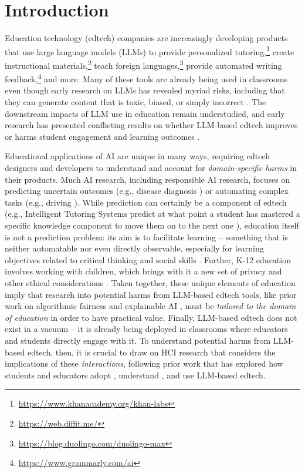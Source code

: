 \section{Introduction}
Education technology (edtech) companies are increasingly developing products that use large language models (LLMs) to provide personalized tutoring,\footnote{\url{https://www.khanacademy.org/khan-labs}} create instructional materials,\footnote{\url{https://web.diffit.me/}} teach foreign languages,\footnote{\url{https://blog.duolingo.com/duolingo-max}} provide automated writing feedback,\footnote{\url{https://www.grammarly.com/ai}} and more. Many of these tools are already being used in classrooms even though early research on LLMs has revealed myriad risks, including that they can generate content that is toxic, biased, or simply incorrect \cite{bender_dangers_2021, weidinger_taxonomy_2022, lee2024life}. The downstream impacts of LLM use in education remain understudied, and early research has presented conflicting results on whether LLM-based edtech improves or harms student engagement and learning outcomes \cite{nie_gpt_2024, bastani_generative_2024, lo_engagement_2024, pardos_chatgpt_2024}. 

Educational applications of AI are unique in many ways, requiring edtech designers and developers to understand and account for \textit{domain-specific harms} in their products. Much AI research, including responsible AI research, focuses on predicting uncertain outcomes (e.g., disease diagnosis \cite{Hosny2018-ph, obermeyer_dissecting_2019}) or automating complex tasks (e.g., driving \cite{Yurtsever_2020_Survey, ijcai2017p654}). While prediction can certainly be a component of edtech (e.g., Intelligent Tutoring Systems predict at what point a student has mastered a specific knowledge component to move them on to the next one \cite{feng_can_2008}), education itself is not a prediction problem: its aim is to facilitate learning -- something that is neither automatable nor even directly observable, especially for learning objectives related to critical thinking and social skills \cite{MERCER1996359, schuller_benefits_2005, ERIC_survey}. Further, K-12 education involves working with children, which brings with it a new set of privacy and other ethical considerations \cite{Einarsdottir_2007_research}. Taken together, these unique elements of education imply that research into potential harms from LLM-based edtech tools, like prior work on algorithmic fairness \cite{kizilcec_algorithmic_2022, harvey2024towards} and explainable AI \cite{khosravi_explainable_2022}, must be \textit{tailored to the domain of education} in order to have practical value. Finally, LLM-based edtech does not exist in a vacuum -- it is already being deployed in classrooms where educators and students directly engage with it. To understand potential harms from LLM-based edtech, then, it is crucial to draw on HCI research that considers the implications of these \textit{interactions}, following prior work that has explored how students and educators adopt \cite{ibrahim_understanding_2022, kizilcec2024perceived, viberg2024explains}, understand \cite{tan_more_2024, han_teachers_2024}, and use \cite{park_promise_2024, belghith_testing_2024} LLM-based edtech.

